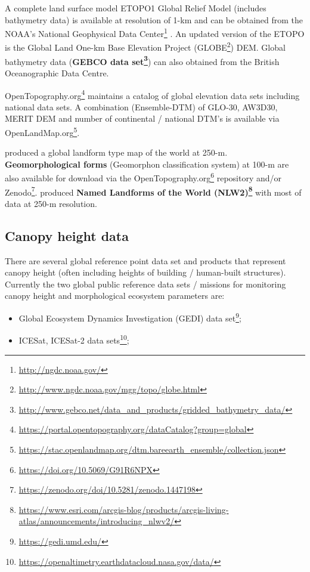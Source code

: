 \documentclass[
  graybox,natbib,nospthms]{svmono}
\providecommand{\tightlist}{%
  \setlength{\itemsep}{0pt}\setlength{\parskip}{0pt}}
\providecommand{\tightlist}{\setlength{\itemsep}{0pt}\setlength{\parskip}{0pt}}
\renewcommand{\href}[2]{#2 (\url{#1})}
\renewcommand{\href}[2]{#2\footnote{\url{#1}}}
\begin{document}
A complete land surface model ETOPO1 Global Relief Model (includes bathymetry data)
is available at resolution of 1-km and can be obtained from the \href{http://ngdc.noaa.gov/}{NOAA's National Geophysical Data Center} \citep{amante2009etopo1}.
An updated version of the ETOPO is the Global Land One-km Base Elevation Project (\href{http://www.ngdc.noaa.gov/mgg/topo/globe.html}{GLOBE}) DEM. Global bathymetry data (\textbf{\href{http://www.gebco.net/data_and_products/gridded_bathymetry_data/}{GEBCO data set}}) can also obtained from the British Oceanographic Data Centre.

\href{https://portal.opentopography.org/dataCatalog?group=global}{OpenTopography.org} maintains a catalog of
global elevation data sets including national data sets. A combination (Ensemble-DTM) of
GLO-30, AW3D30, MERIT DEM and number of continental / national DTM's is available via \href{https://stac.openlandmap.org/dtm.bareearth_ensemble/collection.json}{OpenLandMap.org}.

\citet{iwahashi2007automated} produced a global landform type map of the world at 250-m.
\textbf{Geomorphological forms} (Geomorphon classification system) at 100-m are also available for download
via the \href{https://doi.org/10.5069/G91R6NPX}{OpenTopography.org} repository and/or \href{https://zenodo.org/doi/10.5281/zenodo.1447198}{Zenodo}.
\citet{Frye2023} produced \textbf{\href{https://www.esri.com/arcgis-blog/products/arcgis-living-atlas/announcements/introducing_nlwv2/}{Named Landforms of the World (NLW2)}} with most of data at 250-m resolution.

\hypertarget{canopy-height-data}{%
\subsection{Canopy height data}\label{canopy-height-data}}

There are several global reference point data set and products that represent canopy height (often
including heights of building / human-built structures). Currently the two global
public reference data sets / missions for monitoring canopy height and morphological ecosystem
parameters are:

\begin{itemize}
\tightlist
\item
  \href{https://gedi.umd.edu/}{Global Ecosystem Dynamics Investigation (GEDI) data set};
\item
  \href{https://openaltimetry.earthdatacloud.nasa.gov/data/}{ICESat, ICESat-2 data sets};
\end{itemize}
\end{document}

